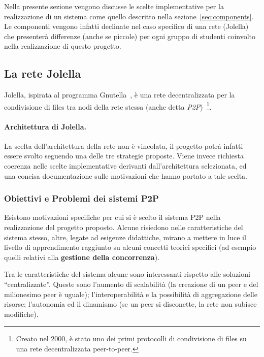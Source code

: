
Nella presente sezione vengono discusse le scelte implementative per la
realizzazione di un sistema come quello descritto nella
sezione~\ref{sec:components}. Le componenti vengono infatti declinate nel caso
specifico di una rete (Jolella) che presenterà differenze (anche se piccole) per
ogni gruppo di studenti coinvolto nella realizzazione di questo progetto.

\subsection{La rete Jolella}
\label{subsec:jolella}

Jolella, ispirata al programma Gnutella~\cite{gnutella}, è una rete
decentralizzata per la condivisione di files tra nodi della rete stessa (anche
detta \textit{P2P})~\footnote{Creato nel 2000, è stato uno dei primi protocolli
 di condivisione di files su una rete decentralizzata peer-to-peer.}.

\paragraph{Architettura di Jolella.} La scelta dell'architettura della rete non è
vincolata, il progetto potrà infatti essere svolto seguendo una delle tre
strategie proposte. Viene invece richiesta coerenza nelle scelte implementative
derivanti dall'architettura selezionata, ed una concisa documentazione sulle
motivazioni che hanno portato a tale scelta.

\subsubsection{Obiettivi e Problemi dei sistemi P2P}

Esistono motivazioni specifiche per cui si è scelto il sistema P2P nella
realizzazione del progetto proposto. Alcune risiedono nelle caratteristiche del
sistema stesso, altre, legate ad esigenze didattiche, mirano a mettere in luce
il livello di apprendimento raggiunto su alcuni concetti teorici specifici (ad
esempio quelli relativi alla \textbf{gestione della concorrenza}).

Tra le caratteristiche del sistema alcune sono interessanti rispetto alle
soluzioni ``centralizzate''. Queste sono l'aumento di scalabilità (la creazione
di un peer e del milionesimo peer è uguale); l'interoperabilità e la possibilità
di aggregazione delle risorse; l'autonomia ed il dinamismo (se un peer si
disconette, la rete non subisce modifiche).

